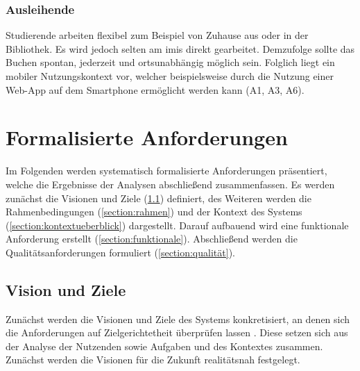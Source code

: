 \subsubsection{Ausleihende}
Studierende arbeiten flexibel zum Beispiel von Zuhause aus oder in der Bibliothek. Es wird jedoch
selten am \ac{imis} direkt gearbeitet. Demzufolge sollte das Buchen spontan, jederzeit und ortsunabhängig
möglich sein. Folglich liegt ein mobiler Nutzungskontext vor, welcher beispielsweise durch die Nutzung
einer Web-App auf dem Smartphone ermöglicht werden kann (A1, A3, A6).


\section{Formalisierte Anforderungen}
\label{section:anforderung}

Im Folgenden werden systematisch formalisierte Anforderungen präsentiert, welche die Ergebnisse der
Analysen abschließend zusammenfassen. Es werden zunächst die Visionen und Ziele
(\ref{section:visionziel}) definiert, des Weiteren werden die Rahmenbedingungen
(\ref{section:rahmen}) und der Kontext des Systems (\ref{section:kontextueberblick}) dargestellt.
Darauf aufbauend wird eine funktionale Anforderung erstellt (\ref{section:funktionale}).
Abschließend werden die Qualitätsanforderungen formuliert (\ref{section:qualität}).


\subsection{Vision und Ziele}
\label{section:visionziel}
Zunächst werden die Visionen und Ziele des Systems konkretisiert, an denen sich die Anforderungen
auf Zielgerichtetheit überprüfen lassen \cite{Balzert2009}. Diese setzen sich aus der Analyse der
Nutzenden sowie Aufgaben und des Kontextes zusammen. Zunächst werden die Visionen für die Zukunft
realitätsnah festgelegt.

